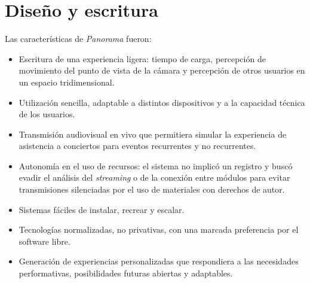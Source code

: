 
\section*{Diseño y escritura} %

Las características de \textit{Panorama} fueron:

\begin{itemize}
\item Escritura de una experiencia ligera: tiempo de carga, percepción de movimiento del punto de vista de la cámara y percepción de otros usuarios en un espacio tridimensional.  
\item Utilización sencilla, adaptable a distintos dispositivos y a la capacidad técnica de los usuarios.
\item Transmisión audiovisual en vivo que permitiera simular la experiencia de asistencia a conciertos para eventos recurrentes y no recurrentes. 
\item Autonomía en el uso de recursos: el sistema no implicó un registro y buscó evadir el análisis del \textit{streaming} o de la conexión entre módulos para evitar transmisiones silenciadas por el uso de materiales con derechos de autor. 
\item Sistemas fáciles de instalar, recrear y escalar.
\item Tecnologías normalizadas, no privativas, con una marcada preferencia por el software libre.
\item Generación de experiencias personalizadas que respondiera a las necesidades performativas, posibilidades futuras abiertas y adaptables. 
\end{itemize}


